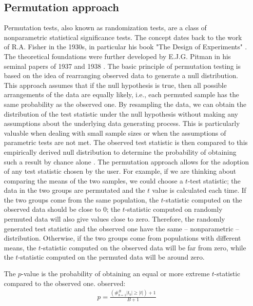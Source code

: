 \documentclass[twocolumn]{article}\usepackage[]{graphicx}\usepackage[]{xcolor}
\begin{document}
\subsection{Permutation approach}

Permutation tests, also known as randomization tests, are a class of nonparametric statistical significance tests. The concept dates back to the work of R.A. Fisher in the 1930s, in particular his book "The Design of Experiments" \cite{fisher:1935}. The theoretical foundations were further developed by E.J.G. Pitman in his seminal papers of 1937 \cite{pitman1937significance} and 1938 \cite{pitman1938significance}. The basic principle of permutation testing is based on the idea of rearranging observed data to generate a null distribution. This approach assumes that if the null hypothesis is true, then all possible arrangements of the data are equally likely, i.e., each permuted sample has the same probability as the observed one. By resampling the data, we can obtain the distribution of the test statistic under the null hypothesis without making any assumptions about the underlying data generating process. This is particularly valuable when dealing with small sample sizes or when the assumptions of parametric tests are not met. The observed test statistic is then compared to this empirically derived null distribution to determine the probability of obtaining such a result by chance alone \cite{pesarin2001}.
The permutation approach allows for the adoption of any test statistic chosen by the user.
For example, if we are thinking about comparing the means of the two samples, we could choose a $t$-test statistic; the data in the two groups are permutated and the $t$ value is calculated each time. If the two groups come from the same population, the $t$-statistic computed on the observed data should be close to 0; the $t$-statistic computed on randomly permuted data will also give values close to zero. Therefore, the randomly generated test statistic and the observed one have the same -- nonparametric -- distribution.  Otherwise, if
the two groups come from populations with different means, the $t$-statistic computed on the observed data will be far from zero, while the $t$-statistic computed on the permuted data will be around zero.

The $p$-value is the probability of obtaining an equal or more extreme $t$-statistic compared to the observed one.
observed:
\begin{eqnarray}
p=\frac{(\#_{b=1}^B |t_b|\geq |t|)+1}{B+1}
\end{eqnarray}
\end{document}
